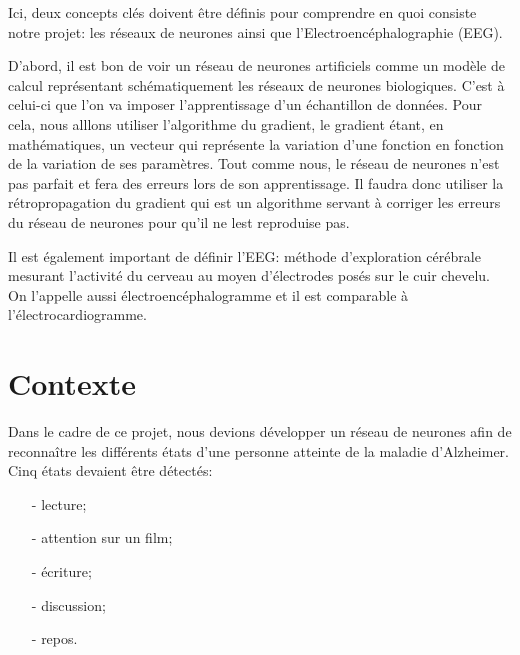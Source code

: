 	Ici, deux concepts clés doivent être définis pour comprendre en quoi consiste notre projet: les réseaux de neurones ainsi que l'Electroencéphalographie (EEG). 
	
	D'abord, il est bon de voir un réseau de neurones artificiels comme un modèle de calcul représentant schématiquement les réseaux de neurones biologiques. C'est à celui-ci que l'on va imposer l'apprentissage d'un échantillon de données. Pour cela, nous alllons utiliser l'algorithme du gradient, le gradient étant, en mathématiques, un vecteur qui représente la variation d'une fonction en fonction de la variation de ses paramètres. Tout comme nous, le réseau de neurones n'est pas parfait et fera des erreurs lors de son apprentissage. Il faudra donc utiliser la rétropropagation du gradient qui est un algorithme servant à corriger les erreurs du réseau de neurones pour qu'il ne lest reproduise pas.
	
	Il est également important de définir l'EEG: méthode d'exploration cérébrale mesurant l'activité du cerveau au moyen d'électrodes posés sur le cuir chevelu. On l'appelle aussi électroencéphalogramme et il est comparable à l'électrocardiogramme.
	


	\chapter{Contexte} %
	\label{chap:contexte}
	
	   Dans le cadre de ce projet, nous devions développer un réseau de neurones afin de reconnaître les différents états d'une personne atteinte de la maladie d'Alzheimer. Cinq états devaient être détectés:
	   \begin{itemize}
	   	\item[-] lecture;
		\item[-] attention sur un film;
		\item[-] écriture;
		\item[-] discussion;
		\item[-] repos.
	   \end{itemize}
	
	
	
	

